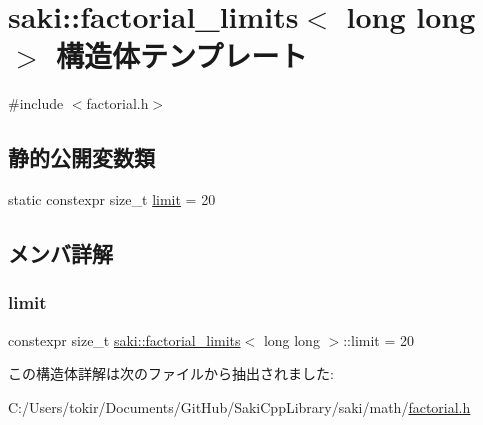 \hypertarget{structsaki_1_1factorial__limits_3_01long_01long_01_4}{}\section{saki\+:\+:factorial\+\_\+limits$<$ long long $>$ 構造体テンプレート}
\label{structsaki_1_1factorial__limits_3_01long_01long_01_4}


{\ttfamily \#include $<$factorial.\+h$>$}

\subsection*{静的公開変数類}
\begin{DoxyCompactItemize}
\item 
static constexpr size\+\_\+t \mbox{\hyperlink{structsaki_1_1factorial__limits_3_01long_01long_01_4_ae18bb2d394a29c3be5af05cec4454d02}{limit}} = 20
\end{DoxyCompactItemize}


\subsection{メンバ詳解}
\mbox{\label{structsaki_1_1factorial__limits_3_01long_01long_01_4_ae18bb2d394a29c3be5af05cec4454d02}} 
\subsubsection{\texorpdfstring{limit}{limit}}
{\footnotesize\ttfamily constexpr size\+\_\+t \mbox{\hyperlink{structsaki_1_1factorial__limits}{saki\+::factorial\+\_\+limits}}$<$ long long $>$\+::limit = 20\hspace{0.3cm}{\ttfamily [static]}}



この構造体詳解は次のファイルから抽出されました\+:\begin{DoxyCompactItemize}
\item 
C\+:/\+Users/tokir/\+Documents/\+Git\+Hub/\+Saki\+Cpp\+Library/saki/math/\mbox{\hyperlink{factorial_8h}{factorial.\+h}}\end{DoxyCompactItemize}
